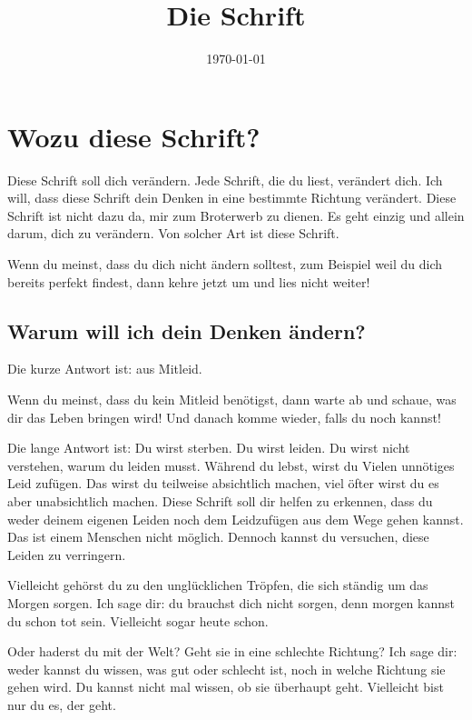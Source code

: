 \documentclass[12pt]{book}
\begin{document}
\title{\fontsize{40}{40}\selectfont \textbf{Die Schrift}}
\date{\today}
\maketitle

\chapter{Wozu diese Schrift?}

Diese Schrift soll dich verändern. Jede Schrift, die du liest, verändert dich. 
Ich will, dass diese Schrift dein Denken in eine bestimmte Richtung verändert.
Diese Schrift ist nicht dazu da, mir zum Broterwerb zu dienen.
Es geht einzig und allein darum, dich zu verändern. Von solcher Art ist diese Schrift. 

Wenn du meinst, dass du dich nicht ändern solltest, zum Beispiel weil du dich
bereits perfekt findest, dann kehre jetzt um und lies nicht weiter!

\section{Warum will ich dein Denken ändern?}

Die kurze Antwort ist: aus Mitleid. 

Wenn du meinst, dass du kein Mitleid benötigst, dann warte ab und 
schaue, was dir das Leben bringen wird! Und danach komme wieder, falls du noch kannst!

Die lange Antwort ist: Du wirst sterben. Du wirst leiden. Du wirst nicht verstehen, warum du leiden musst.
Während du lebst, wirst du Vielen unnötiges Leid zufügen. Das wirst du teilweise absichtlich machen, viel öfter 
wirst du es aber unabsichtlich machen. Diese Schrift soll dir helfen zu erkennen, dass du
weder deinem eigenen Leiden noch dem Leidzufügen aus dem Wege gehen kannst.
Das ist einem Menschen nicht möglich. Dennoch kannst du versuchen, diese Leiden zu verringern.

Vielleicht gehörst du zu den unglücklichen Tröpfen, die sich ständig um das Morgen sorgen.
Ich sage dir: du brauchst dich nicht sorgen, denn morgen kannst du schon tot sein. Vielleicht sogar heute schon.

Oder haderst du mit der Welt? Geht sie in eine schlechte Richtung?
Ich sage dir: weder kannst du wissen, was gut oder schlecht ist, noch in welche Richtung sie gehen wird.
Du kannst nicht mal wissen, ob sie überhaupt geht. Vielleicht bist nur du es, der geht.
\end{document}
